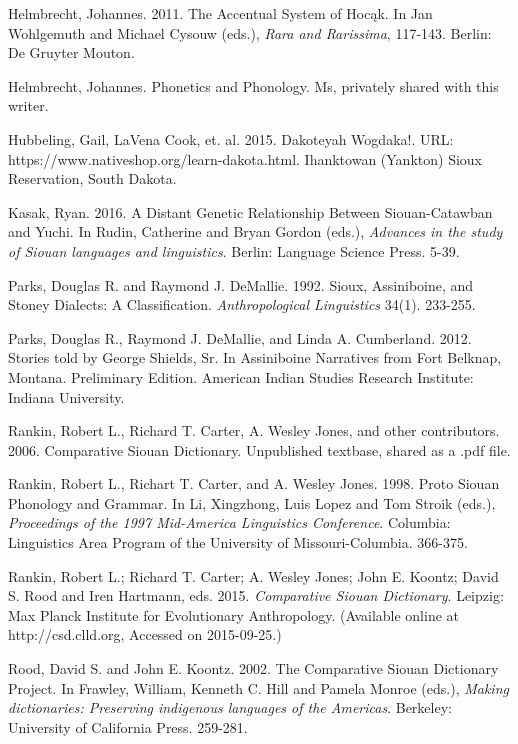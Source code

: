 \documentclass[output=paper]{LSP/langsci}
\begin{document}
\begin{reflist}

Helmbrecht, Johannes.  2011. The Accentual System of Hoc\k{a}k.  In Jan Wohlgemuth and Michael Cysouw (eds.), \textit{Rara and Rarissima}, 117-143. Berlin: De Gruyter Mouton.

Helmbrecht, Johannes.  Phonetics and Phonology.  Ms, privately shared with this writer.

Hubbeling, Gail, LaVena Cook, et. al.  2015.  Dakoteyah Wogdaka!.  URL: https://www.nativeshop.org/learn-dakota.html.  Ihanktowan (Yankton) Sioux Reservation, South Dakota.

 Kasak, Ryan. 2016. A Distant Genetic Relationship Between Siouan-Catawban and Yuchi. In Rudin, Catherine and Bryan Gordon (eds.), \textit{Advances in the study of Siouan languages and linguistics}. Berlin: Language Science Press. 5-39.

Parks, Douglas R. and Raymond J. DeMallie. 1992. Sioux, Assiniboine, and Stoney Dialects: A Classification. \textit{Anthropological Linguistics} 34(1). 233-255.

Parks, Douglas R., Raymond J. DeMallie, and Linda A. Cumberland.  2012.  Stories told by George Shields, Sr. In Assiniboine Narratives from Fort Belknap, Montana.  Preliminary Edition.  American Indian Studies Research Institute: Indiana University.

Rankin, Robert L., Richard T. Carter, A. Wesley Jones, and other contributors.  2006.  Comparative Siouan Dictionary.  Unpublished textbase, shared as a .pdf file.

Rankin, Robert L., Richart T. Carter, and A. Wesley Jones.  1998.  Proto Siouan Phonology and Grammar.  In Li, Xingzhong, Luis Lopez and Tom Stroik (eds.), \textit{Proceedings of the 1997 Mid-America Linguistics Conference}.   Columbia: Linguistics Area Program of the University of Missouri-Columbia.  366-375.

Rankin, Robert L.; Richard T. Carter; A. Wesley Jones; John E. Koontz; David S. Rood and Iren Hartmann, eds. 2015. \textit{Comparative Siouan Dictionary}. Leipzig: Max Planck Institute for Evolutionary Anthropology. (Available online at http://csd.clld.org, Accessed on 2015-09-25.) 

Rood, David S. and John E. Koontz.  2002.  The Comparative Siouan Dictionary Project. In Frawley, William, Kenneth C. Hill and Pamela Monroe (eds.),  \textit{Making dictionaries: Preserving indigenous languages of the Americas}. Berkeley: University of California Press. 259-281.  

\end{reflist}
\end{document}
